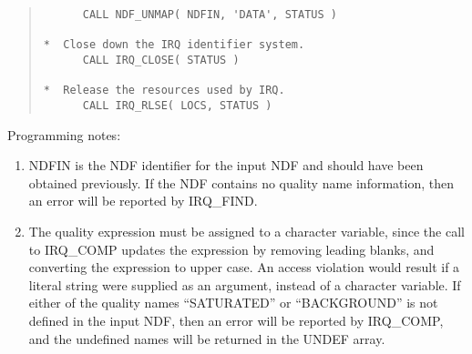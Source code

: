 \begin{quote}
\begin{tabbing}
\verb#      CALL NDF_UNMAP( NDFIN, 'DATA', STATUS )          #\\
\verb#                                                       #\\
\verb#*  Close down the IRQ identifier system.               #\\
\verb#      CALL IRQ_CLOSE( STATUS )                         #\\
\verb#                                                       #\\
\verb#*  Release the resources used by IRQ.                  #\\
\verb#      CALL IRQ_RLSE( LOCS, STATUS )                    #\\

\end{tabbing}
\end{quote}

Programming notes:

\begin{enumerate}

\item NDFIN is the NDF identifier for the input NDF and should have been
obtained previously. If the NDF contains no quality name information, then
an error will be reported by IRQ\_FIND.

\item The quality expression must be assigned to a character variable, since the
call to IRQ\_COMP updates the expression by removing leading blanks, and
converting the expression to upper case. An access violation would result if a
literal string were supplied as an argument, instead of a character variable. If
either of the quality names ``SATURATED'' or ``BACKGROUND'' is not defined in
the input NDF, then an error will be reported by IRQ\_COMP, and the undefined
names will be returned in the UNDEF array.

\end{enumerate}

\newpage
